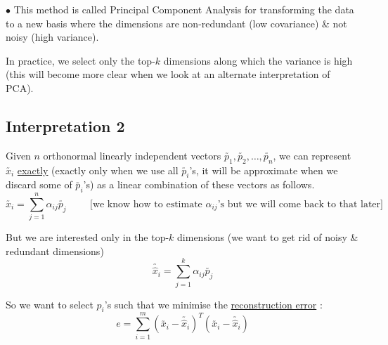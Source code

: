 \documentclass[11pt, a4paper]{article}
\begin{document}
\vspace{0.3cm}

$\bullet$ This method is called Principal Component Analysis for transforming the data to a new basis where the dimensions are non-redundant (low covariance) \& not noisy (high variance). \\

\vspace{0.3cm}

In practice, we select only the top-$k$ dimensions along which the variance is high (this will become more clear when we look at an alternate interpretation of PCA).

\newpage

\subsection{Interpretation 2}

Given $n$ orthonormal linearly independent vectors $\utilde{p_1}, \utilde{p_2}, \ldots, \utilde{p_n}$, we can represent $\utilde{x_i}$ \underline{exactly} (exactly only when we use all $\utilde{p_i}$'s, it will be approximate when we discard some of $\utilde{p_i}$'s) as a linear combination of these vectors as follows.
\[
\utilde{x_i} = \sum_{j=1}^{n} \alpha_{ij} \utilde{p_j} \hspace{1cm}  \text{[we know how to estimate $\alpha_{ij}$'s but we will come back to that later]}
\]

But we are interested only in the top-$k$ dimensions (we want to get rid of noisy \& redundant dimensions)
\[
\utilde{\hat{x}_i} = \sum_{j=1}^{k} \alpha_{ij} \utilde{p_j}
\]

So we want to select $p_i$'s such that we minimise the \underline{reconstruction error} :
\[
e = \sum_{i=1}^{m} (\utilde{x_i} - \utilde{\hat{x}_i})^T (\utilde{x_i} - \utilde{\hat{x}_i})
\]
\end{document}

